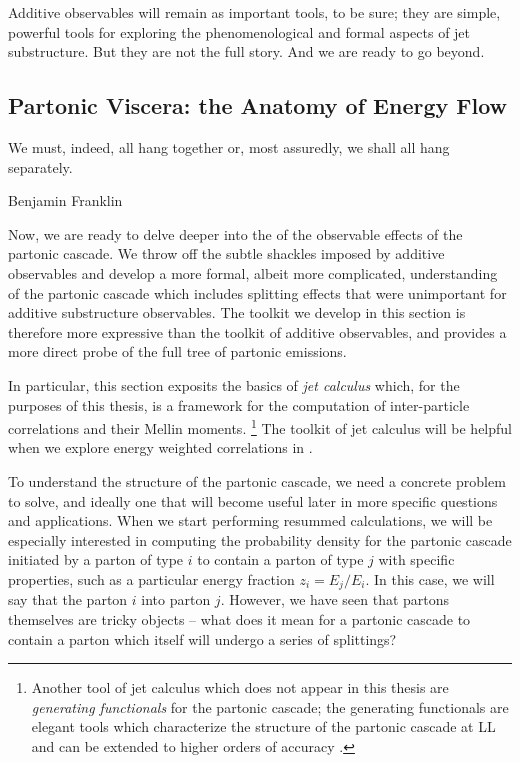 Additive observables will remain as important tools, to be sure;
%
they are simple, powerful tools for exploring the phenomenological and formal aspects of jet substructure.
%
But they are not the full story.
%
And we are ready to go beyond.




\subsection{Partonic Viscera: the Anatomy of Energy Flow}
\label{sec:p2p-fragmentation}

\epigraph{We must, indeed, all hang together or, most assuredly, we shall all hang separately.}{Benjamin Franklin}


Now, we are ready to delve deeper into the of the observable effects of the partonic cascade.
%
We throw off the subtle shackles imposed by additive observables and develop a more formal, albeit more complicated, understanding of the partonic cascade which includes splitting effects that were unimportant for additive substructure observables.
%
The toolkit we develop in this section is therefore more expressive than the toolkit of additive observables, and provides a more direct probe of the full tree of partonic emissions.


In particular, this section exposits the basics of \textit{jet calculus} \cite{} which, for the purposes of this thesis, is a framework for the computation of inter-particle correlations and their Mellin moments.%
\footnote{
    Another tool of jet calculus which does not appear in this thesis are \textit{generating functionals} for the partonic cascade;
    the generating functionals are elegant tools which characterize the structure of the partonic cascade at LL \cite{} and can be extended to higher orders of accuracy \cite{}.
}
%
The toolkit of jet calculus will be helpful when we explore energy weighted correlations in .



To understand the structure of the partonic cascade, we need a concrete problem to solve, and ideally one that will become useful later in more specific questions and applications.
%
When we start performing resummed calculations, we will be especially interested in computing the probability density for the partonic cascade initiated by a parton of type \(i\) to contain a parton of type \(j\) with specific properties, such as a particular energy fraction \(z_i = E_j/E_i\).
%
In this case, we will say that the parton \(i\)  into parton \(j\).
%
However, we have seen that partons themselves are tricky objects -- what does it mean for a partonic cascade to contain a parton which itself will undergo a series of splittings?


